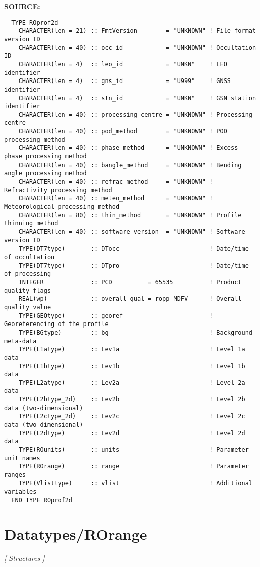 \textbf{SOURCE:}\hspace{0.08in}\begin{Verbatim}
  TYPE ROprof2d
    CHARACTER(len = 21) :: FmtVersion        = "UNKNOWN" ! File format version ID
    CHARACTER(len = 40) :: occ_id            = "UNKNOWN" ! Occultation ID
    CHARACTER(len = 4)  :: leo_id            = "UNKN"    ! LEO identifier
    CHARACTER(len = 4)  :: gns_id            = "U999"    ! GNSS identifier
    CHARACTER(len = 4)  :: stn_id            = "UNKN"    ! GSN station identifier
    CHARACTER(len = 40) :: processing_centre = "UNKNOWN" ! Processing centre
    CHARACTER(len = 40) :: pod_method        = "UNKNOWN" ! POD processing method
    CHARACTER(len = 40) :: phase_method      = "UNKNOWN" ! Excess phase processing method
    CHARACTER(len = 40) :: bangle_method     = "UNKNOWN" ! Bending angle processing method
    CHARACTER(len = 40) :: refrac_method     = "UNKNOWN" ! Refractivity processing method
    CHARACTER(len = 40) :: meteo_method      = "UNKNOWN" ! Meteorological processing method
    CHARACTER(len = 80) :: thin_method       = "UNKNOWN" ! Profile thinning method
    CHARACTER(len = 40) :: software_version  = "UNKNOWN" ! Software version ID
    TYPE(DT7type)       :: DTocc                         ! Date/time of occultation
    TYPE(DT7type)       :: DTpro                         ! Date/time of processing
    INTEGER             :: PCD          = 65535          ! Product quality flags
    REAL(wp)            :: overall_qual = ropp_MDFV      ! Overall quality value
    TYPE(GEOtype)       :: georef                        ! Georeferencing of the profile
    TYPE(BGtype)        :: bg                            ! Background meta-data
    TYPE(L1atype)       :: Lev1a                         ! Level 1a data
    TYPE(L1btype)       :: Lev1b                         ! Level 1b data
    TYPE(L2atype)       :: Lev2a                         ! Level 2a data
    TYPE(L2btype_2d)    :: Lev2b                         ! Level 2b data (two-dimensional)
    TYPE(L2ctype_2d)    :: Lev2c                         ! Level 2c data (two-dimensional)
    TYPE(L2dtype)       :: Lev2d                         ! Level 2d data
    TYPE(ROunits)       :: units                         ! Parameter unit names
    TYPE(ROrange)       :: range                         ! Parameter ranges
    TYPE(Vlisttype)     :: vlist                         ! Additional variables
  END TYPE ROprof2d
\end{Verbatim}
\section{Datatypes/ROrange}
\textsl{[ Structures ]}

